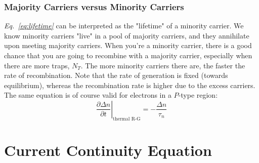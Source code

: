 \subsubsection*{Majority Carriers versus Minority Carriers}
\emph{Eq.~\ref{eq:lifetime}} can be interpreted as the "lifetime" of a minority carrier.  We know minority carriers "live" in a pool of majority carriers, and they annihilate upon meeting majority carriers.  When you're a minority carrier, there is a good chance that you are going to recombine with a majority carrier, especially when there are more traps, $N_T$.  The more minority carriers there are, the faster the rate of recombination.  Note that the rate of generation is fixed (towards equilibrium), whereas the recombination rate is higher due to the excess carriers.  The same equation is of course valid for electrons in a $P$-type region:
    \begin{equation}
        \left. \frac{\partial \Delta n}{\partial t} \right|_{\text{thermal R-G}} = - \frac{\Delta n}{\tau_n}
    \end{equation}
\section{Current Continuity Equation}
